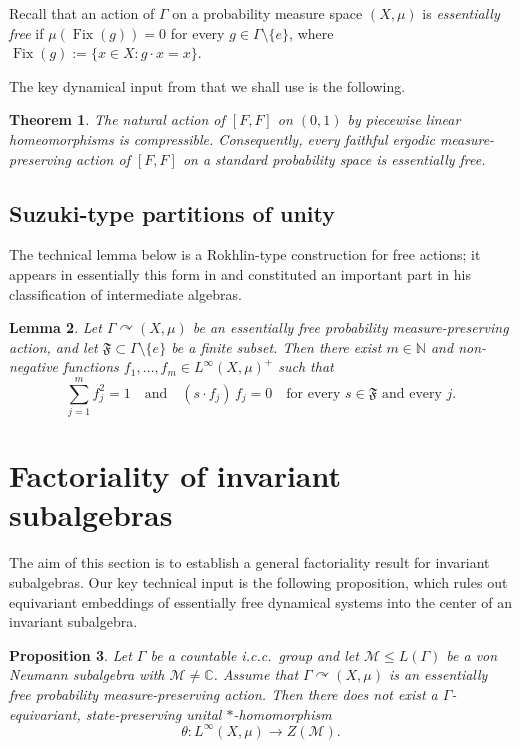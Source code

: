 \documentclass[11pt]{amsart}
\newtheorem{theorem}{Theorem}[section]
\newtheorem{proposition}[theorem]{Proposition}
\newtheorem{lemma}[theorem]{Lemma}
\theoremstyle{definition}
\newcommand{\C}{\mathbb{C}}
\newcommand{\cM}{\mathcal{M}}
\newcommand{\fF}{\mathfrak{F}}
\newcommand{\Fix}{\operatorname{Fix}}
\begin{document}
Recall that an action of $\Gamma$ on a probability measure space $(X, \mu)$ is \emph{essentially free} if $\mu(\Fix(g)) = 0$ for every $g \in \Gamma \setminus \{e\}$, where $\Fix(g) := \{x \in X : g \cdot x = x\}$.

The key dynamical input from \cite{DM14} that we shall use is the following.

\begin{theorem}\cite[Lemma 3.2, Corollary 3.3, Corollary 3.10]{DM14}\label{thm:DM}
The natural action of $[F,F]$ on $(0,1)$ by piecewise linear homeomorphisms is compressible. Consequently, every faithful ergodic measure-preserving action of $[F,F]$ on a standard probability space is essentially free.
\end{theorem}

\subsection{Suzuki-type partitions of unity}

The technical lemma below is a Rokhlin-type construction for free actions; it appears in essentially this form in \cite{suzuki2020complete} and constituted an important part in his classification of intermediate algebras.

\begin{lemma}\label{lem:suzuki}
Let $\Gamma \curvearrowright (X, \mu)$ be an essentially free probability measure-preserving action, and let $\fF \subset \Gamma \setminus \{e\}$ be a finite subset. Then there exist $m\in\mathbb N$ and non-negative functions $f_1, \dots, f_m \in L^\infty(X, \mu)^+$ such that
\[
\sum_{j=1}^m f_j^2 = 1 \quad \text{and} \quad (s \cdot f_j) \, f_j = 0 \quad \text{for every } s \in \fF \text{ and every } j.
\]
\end{lemma}

\section{Factoriality of invariant subalgebras}\label{sec:factoriality}

The aim of this section is to establish a general factoriality result for invariant subalgebras. Our key technical input is the following proposition, which rules out equivariant embeddings of essentially free dynamical systems into the center of an invariant subalgebra.

\begin{proposition}\label{prop:no-equivariant-hom}
Let $\Gamma$ be a countable i.c.c.\ group and let $\cM \le L(\Gamma)$ be a von Neumann subalgebra with $\cM \neq \C$. Assume that $\Gamma \curvearrowright (X, \mu)$ is an essentially free probability measure-preserving action. Then there does not exist a $\Gamma$-equivariant, state-preserving unital $*$-homomorphism
\[
\theta \colon L^\infty(X, \mu) \to Z(\cM).
\]
\end{proposition}
\end{document}

